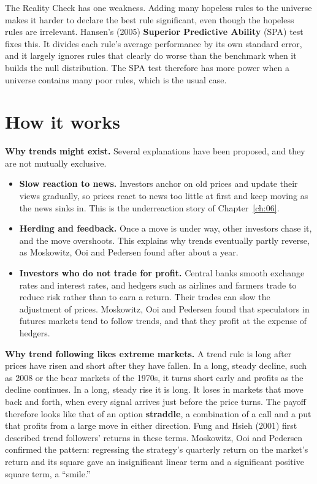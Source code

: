 The Reality Check has one weakness. Adding many hopeless rules to the universe makes it harder to declare the best rule significant, even though the hopeless rules are irrelevant. Hansen's (2005) \textbf{Superior Predictive Ability} (SPA) test fixes this. It divides each rule's average performance by its own standard error, and it largely ignores rules that clearly do worse than the benchmark when it builds the null distribution. The SPA test therefore has more power when a universe contains many poor rules, which is the usual case.

\section{How it works}
\label{sec:09-how}

\textbf{Why trends might exist.} Several explanations have been proposed, and they are not mutually exclusive.

\begin{itemize}
  \item \textbf{Slow reaction to news.} Investors anchor on old prices and update their views gradually, so prices react to news too little at first and keep moving as the news sinks in. This is the underreaction story of Chapter~\ref{ch:06}.
  \item \textbf{Herding and feedback.} Once a move is under way, other investors chase it, and the move overshoots. This explains why trends eventually partly reverse, as Moskowitz, Ooi and Pedersen found after about a year.
  \item \textbf{Investors who do not trade for profit.} Central banks smooth exchange rates and interest rates, and hedgers such as airlines and farmers trade to reduce risk rather than to earn a return. Their trades can slow the adjustment of prices. Moskowitz, Ooi and Pedersen found that speculators in futures markets tend to follow trends, and that they profit at the expense of hedgers.
\end{itemize}

\textbf{Why trend following likes extreme markets.} A trend rule is long after prices have risen and short after they have fallen. In a long, steady decline, such as 2008 or the bear markets of the 1970s, it turns short early and profits as the decline continues. In a long, steady rise it is long. It loses in markets that move back and forth, when every signal arrives just before the price turns. The payoff therefore looks like that of an option \textbf{straddle}, a combination of a call and a put that profits from a large move in either direction. Fung and Hsieh (2001) first described trend followers' returns in these terms. Moskowitz, Ooi and Pedersen confirmed the pattern: regressing the strategy's quarterly return on the market's return and its square gave an insignificant linear term and a significant positive square term, a ``smile.''

